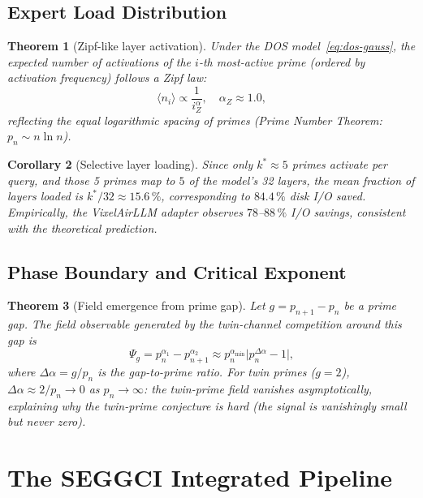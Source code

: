 \documentclass[12pt,a4paper]{article}
\theoremstyle{plain}
\newtheorem{theorem}{Theorem}[section]
\newtheorem{corollary}[theorem]{Corollary}
\theoremstyle{definition}
\theoremstyle{remark}
\begin{document}
\subsection{Expert Load Distribution}

\begin{theorem}[Zipf-like layer activation]
\label{thm:zipf}
Under the DOS model~\eqref{eq:dos-gauss}, the expected number of
activations of the $i$-th most-active prime (ordered by activation
frequency) follows a Zipf law:
\begin{equation}
\langle n_i \rangle \propto \frac{1}{i^\alpha_Z},
\quad \alpha_Z \approx 1.0,
\end{equation}
reflecting the equal logarithmic spacing of primes
(Prime Number Theorem: $p_n \sim n\ln n$).
\end{theorem}

\begin{corollary}[Selective layer loading]
Since only $k^* \approx 5$ primes activate per query, and those 5
primes map to $5$ of the model's 32 layers, the mean fraction of
layers loaded is $k^*/32 \approx 15.6\,\%$, corresponding to
$84.4\,\%$ disk I/O saved.  Empirically, the VixelAirLLM adapter
observes $78$--$88\,\%$ I/O savings, consistent with the theoretical
prediction.
\end{corollary}

\subsection{Phase Boundary and Critical Exponent}

\begin{theorem}[Field emergence from prime gap]
\label{thm:prime-field}
Let $g = p_{n+1} - p_n$ be a prime gap.  The field observable generated
by the twin-channel competition around this gap is
\begin{equation}
\Psi_g = p_n^{\alpha_1} - p_{n+1}^{\alpha_2}
\approx p_n^{\alpha_{\min}} \bigl|p_n^{\Delta\alpha} - 1\bigr|,
\end{equation}
where $\Delta\alpha = g / p_n$ is the \emph{gap-to-prime ratio}.
For twin primes ($g = 2$), $\Delta\alpha \approx 2/p_n \to 0$ as
$p_n\to\infty$: the twin-prime field vanishes asymptotically,
explaining why the twin-prime conjecture is hard (the signal is
vanishingly small but never zero).
\end{theorem}

\section{The SEGGCI Integrated Pipeline}
\label{sec:seggci}
\end{document}
